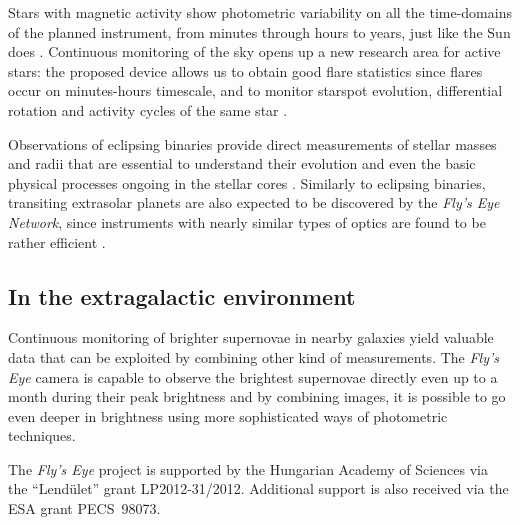 Stars with magnetic activity show photometric variability on all the
time-domains of the planned instrument, from minutes through hours to
years, just like the Sun does \citep{strassmeier2009}.
Continuous monitoring of the sky opens up a new research area for
active stars: the proposed device allows us to obtain good flare
statistics since flares occur on minutes-hours timescale,
and to monitor starspot evolution, differential rotation 
and activity cycles of the same star
\citep[see e.g.][]{hartman2011,walkowicz2011,olah2009}.

Observations of eclipsing binaries provide direct measurements of
stellar masses and radii that are essential to understand their evolution
and even the basic physical processes ongoing in the stellar cores
\citep{latham2009}. Similarly to eclipsing binaries, transiting 
extrasolar planets are also expected to be discovered by the
{\it Fly's Eye Network}, since instruments with nearly similar types
of optics are found to be rather 
efficient \citep{pollacco2004,bakos2004,pepper2007}.

\subsection{In the extragalactic environment}
Continuous monitoring of brighter supernovae in nearby galaxies
yield valuable data that can be exploited by combining
other kind of measurements. The {\it Fly's Eye} camera is capable to observe
the brightest supernovae directly even up to a month
during their peak brightness \citep[see e.g.][]{vinko2012}
and by combining images, it is possible to go even deeper in brightness
using more sophisticated ways of photometric techniques. 

\acknowledgements 
The {\it Fly's Eye} project is supported by the Hungarian Academy of
Sciences via the ``Lend\"ulet'' grant LP2012-31/2012. Additional support
is also received via the ESA grant PECS~98073.


